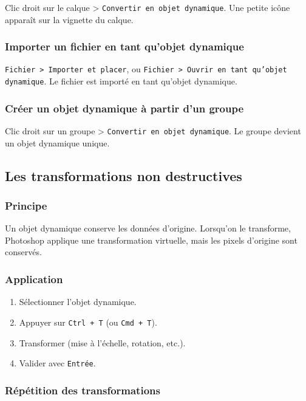 Clic droit sur le calque > \texttt{Convertir en objet dynamique}. Une petite icône apparaît sur la vignette du calque.

\subsubsection{Importer un fichier en tant qu'objet dynamique}

\texttt{Fichier > Importer et placer}, ou \texttt{Fichier > Ouvrir en tant qu'objet dynamique}. Le fichier est importé en tant qu'objet dynamique.

\subsubsection{Créer un objet dynamique à partir d'un groupe}

Clic droit sur un groupe > \texttt{Convertir en objet dynamique}. Le groupe devient un objet dynamique unique.

\subsection{Les transformations non destructives}

\subsubsection{Principe}

Un objet dynamique conserve les données d'origine. Lorsqu'on le transforme, Photoshop applique une transformation virtuelle, mais les pixels d'origine sont conservés.

\subsubsection{Application}

\begin{enumerate}
    \item Sélectionner l'objet dynamique.
    \item Appuyer sur \texttt{Ctrl + T} (ou \texttt{Cmd + T}).
    \item Transformer (mise à l'échelle, rotation, etc.).
    \item Valider avec \texttt{Entrée}.
\end{enumerate}

\subsubsection{Répétition des transformations}

